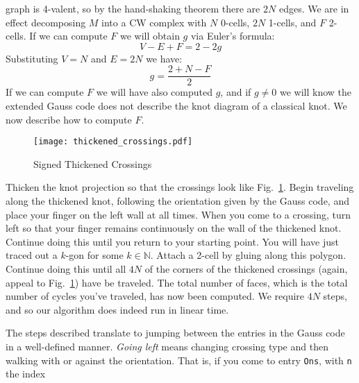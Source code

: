         graph is 4-valent, so by the hand-shaking theorem there are
        $2N$ edges. We are in effect decomposing $M$ into a CW complex with
        $N$ 0-cells, $2N$ 1-cells, and $F$ 2-cells. If we can compute $F$ we
        will obtain $g$ via Euler's formula:
        \begin{equation}
            V-E+F=2-2g
        \end{equation}
        Substituting $V=N$ and $E=2N$ we have:
        \begin{equation}
            g=\frac{2+N-F}{2}
        \end{equation}
        If we can compute $F$ we will have also computed $g$, and if
        $g\ne{0}$ we will know the extended Gauss code does not describe the
        knot diagram of a classical knot. We now describe how to compute $F$.
        \par\hfill\par
        \begin{figure}
            \centering
            \texttt{[image: thickened\_crossings.pdf]}
            \caption{Signed Thickened Crossings}
            \label{fig:thickened_crossings}
        \end{figure}
        Thicken the knot projection so that the crossings look like
        Fig.~\ref{fig:thickened_crossings}. Begin traveling along the thickened
        knot, following the orientation given by the Gauss code, and place your
        finger on the left wall at all times. When you come to a crossing,
        turn left so that your finger remains continuously on the wall of the
        thickened knot. Continue doing this until you return to your starting
        point. You will have just traced out a $k$-gon for some
        $k\in\mathbb{N}$. Attach a 2-cell by gluing along this polygon.
        Continue doing this until all $4N$ of the corners of the thickened
        crossings (again, appeal to Fig.~\ref{fig:thickened_crossings}) have
        be traveled. The total number of faces, which is the total number of
        cycles you've traveled, has now been computed. We require $4N$ steps,
        and so our algorithm does indeed run in linear time.
        \par\hfill\par
        The steps described translate to jumping between the entries in the
        Gauss code in a well-defined manner. \textit{Going left} means changing
        crossing type and then walking with or against the orientation.
        That is, if you come to entry \texttt{Ons}, with \texttt{n} the index
